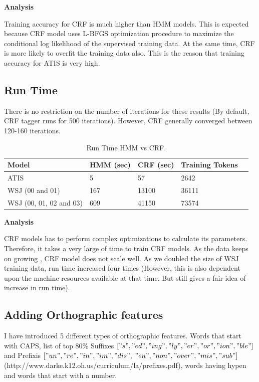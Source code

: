 {\bfseries Analysis}

Training accuracy for CRF is much higher than HMM models. This is expected because CRF model uses L-BFGS optimization procedure to maximize the conditional log likelihood of the supervised training data. At the same time, CRF is more likely to overfit the training data also. This is the reason that training accuracy for ATIS is very high.

\subsection {Run Time}

There is no restriction on the number of iterations for these results (By default, CRF tagger runs for 500 iterations). However, CRF generally converged between 120-160 iterations.

\begin{center}	
	\begin{table}[ht]
  	\centering
   	\begin{tabular}{| l | l | l | l | l |}
    	\hline
        Model & HMM (sec) & CRF (sec) & Training Tokens \\ \hline
        ATIS & 5 & 57 & 2642\\ \hline
        WSJ (00 and 01) & 167 & 13100 & 36111 \\ \hline
	WSJ (00, 01, 02 and 03) & 609 & 41150 & 73574 \\ \hline
    	\end{tabular}
    	\caption{Run Time HMM vs CRF. }
    	\end{table}%
\end{center}
{\bfseries Analysis}

CRF models has to perform complex optimizations to calculate its parameters. Therefore, it takes a very large of time to train CRF models. As the data keeps on growing , CRF model does not scale well. As we doubled the size of WSJ training data, run time increased four times (However, this is also dependent upon the machine resources available at that time. But still gives a fair idea of increase in run time). 

\subsection {Adding Orthographic features}

I have introduced 5 different types of orthographic features. Words that start with CAPS, list of top 80\% Suffixes $["s", "ed", "ing", "ly", "er", "or", "ion", "ble"]$ and Prefixis $["un", "re", "in", "im", "dis",$ $ "en", "non", "over", "mis", "sub"]$ (http://www.darke.k12.oh.us/curriculum/la/prefixes.pdf), words having hypen and words that start with a number.  

